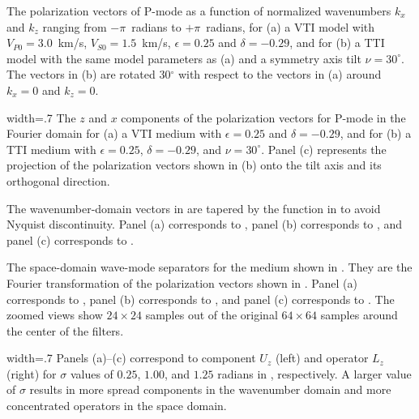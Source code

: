 {The polarization vectors of P-mode as a function of normalized
wavenumbers $k_x$ and $k_z$ ranging from $-\pi$~radians to $+\pi$~radians, for (a) a
VTI model with $V_{P0}=3.0$~km/s, $V_{S0}=1.5$~km/s, $\epsilon=0.25$ and
$\delta=-0.29$, and for (b) a TTI model with the same model parameters
as (a) and a symmetry axis tilt $\nu=30^\circ$. The vectors in (b) are
rotated 30$^\circ$ with respect to the vectors in (a) around $k_x=0$
and $k_z=0$.}


{width=.7\textwidth} {The $z$ and $x$ components of the polarization
vectors for P-mode in the Fourier domain for (a) a VTI medium with
$\epsilon=0.25$ and $\delta=-0.29$, and for (b) a TTI medium with
$\epsilon=0.25$, $\delta=-0.29$, and $\nu=30^\circ$. Panel (c)
represents the projection of the polarization vectors shown in (b)
onto the tilt axis and its orthogonal direction.
\label{fig:kdomain.notaper} }

{The wavenumber-domain vectors
in  are tapered
by the function in  to avoid Nyquist
discontinuity. Panel (a) corresponds to , panel
(b) corresponds to , and panel (c) corresponds
to .
\label{fig:kdomain.tapered}}

{The space-domain wave-mode separators for the medium shown
in . They are the Fourier transformation of the
polarization vectors shown in . Panel (a)
corresponds to , panel (b) corresponds to ,
and panel (c) corresponds to . The zoomed views show
$24\times24$ samples out of the original $64\times64$ samples around the center of
the filters.
\label{fig:xdomain.tapered}}


{width=.7\textwidth} {Panels (a)--(c) correspond to component $U_z$
(left) and operator $L_z$ (right) for $\sigma$ values of $0.25$,
$1.00$, and $1.25$ radians in , respectively.  A larger
value of $\sigma$ results in more spread components in the wavenumber
domain and more concentrated operators in the space domain.
\label{fig:gauss.sigma}}



